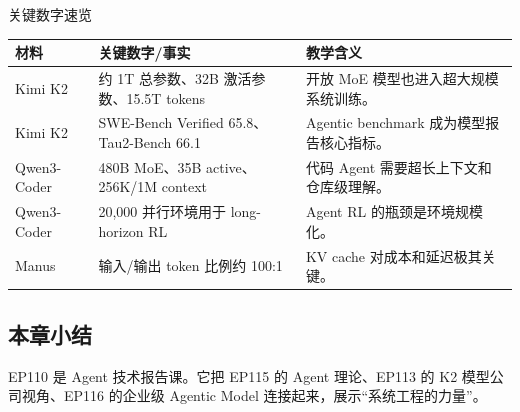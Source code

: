 \begin{knowledgebox}{关键数字速览}
\begin{tabularx}{\textwidth}{p{}p{}X}
\toprule
材料 & 关键数字/事实 & 教学含义 \\
\midrule
Kimi K2 & 约 1T 总参数、32B 激活参数、15.5T tokens & 开放 MoE 模型也进入超大规模系统训练。 \\
Kimi K2 & SWE-Bench Verified 65.8、Tau2-Bench 66.1 & Agentic benchmark 成为模型报告核心指标。 \\
Qwen3-Coder & 480B MoE、35B active、256K/1M context & 代码 Agent 需要超长上下文和仓库级理解。 \\
Qwen3-Coder & 20,000 并行环境用于 long-horizon RL & Agent RL 的瓶颈是环境规模化。 \\
Manus & 输入/输出 token 比例约 100:1 & KV cache 对成本和延迟极其关键。 \\
\bottomrule
\end{tabularx}
\end{knowledgebox}

\subsection{本章小结}

EP110 是 Agent 技术报告课。它把 EP115 的 Agent 理论、EP113 的 K2 模型公司视角、EP116 的企业级 Agentic Model 连接起来，展示“系统工程的力量”。

